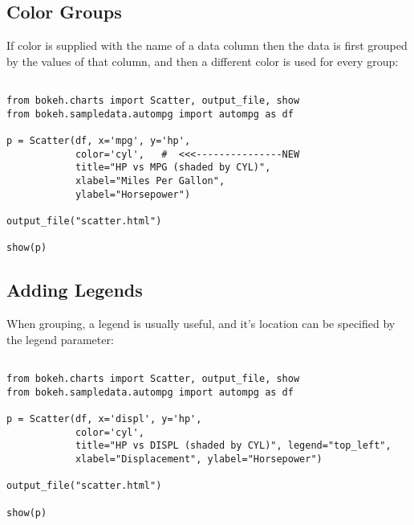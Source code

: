 \documentclass[a4paper,12pt]{article}
\begin{document}
\subsection{Color Groups}
If color is supplied with the name of a data column then the data is first grouped by the values of that column, and then a different color is used for every group:

\begin{framed}
	\begin{verbatim}
	
from bokeh.charts import Scatter, output_file, show
from bokeh.sampledata.autompg import autompg as df

p = Scatter(df, x='mpg', y='hp', 
            color='cyl',   #  <<<---------------NEW
            title="HP vs MPG (shaded by CYL)",
            xlabel="Miles Per Gallon",
            ylabel="Horsepower")

output_file("scatter.html")

show(p)
\end{verbatim}
\end{framed}

\subsection{Adding Legends}
When grouping, a legend is usually useful, and it’s location can be specified by the legend parameter:
\begin{framed}
	\begin{verbatim}
	
from bokeh.charts import Scatter, output_file, show
from bokeh.sampledata.autompg import autompg as df

p = Scatter(df, x='displ', y='hp', 
            color='cyl',
            title="HP vs DISPL (shaded by CYL)", legend="top_left",
            xlabel="Displacement", ylabel="Horsepower")

output_file("scatter.html")

show(p)
\end{verbatim}
\end{framed}
\newpage
\end{document}
